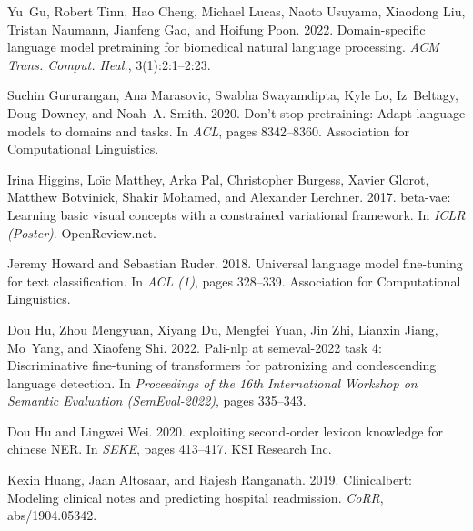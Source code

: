 \documentclass[11pt]{article}
\begin{document}
\begin{thebibliography}{59}
Yu~Gu, Robert Tinn, Hao Cheng, Michael Lucas, Naoto Usuyama, Xiaodong Liu,
  Tristan Naumann, Jianfeng Gao, and Hoifung Poon. 2022.
\newblock Domain-specific language model pretraining for biomedical natural
  language processing.
\newblock \emph{{ACM} Trans. Comput. Heal.}, 3(1):2:1--2:23.

Suchin Gururangan, Ana Marasovic, Swabha Swayamdipta, Kyle Lo, Iz~Beltagy, Doug
  Downey, and Noah~A. Smith. 2020.
\newblock Don't stop pretraining: Adapt language models to domains and tasks.
\newblock In \emph{{ACL}}, pages 8342--8360. Association for Computational
  Linguistics.

Irina Higgins, Lo{\"{\i}}c Matthey, Arka Pal, Christopher Burgess, Xavier
  Glorot, Matthew Botvinick, Shakir Mohamed, and Alexander Lerchner. 2017.
\newblock beta-vae: Learning basic visual concepts with a constrained
  variational framework.
\newblock In \emph{{ICLR} (Poster)}. OpenReview.net.

Jeremy Howard and Sebastian Ruder. 2018.
\newblock Universal language model fine-tuning for text classification.
\newblock In \emph{{ACL} {(1)}}, pages 328--339. Association for Computational
  Linguistics.

Dou Hu, Zhou Mengyuan, Xiyang Du, Mengfei Yuan, Jin Zhi, Lianxin Jiang,
  Mo~Yang, and Xiaofeng Shi. 2022.
\newblock Pali-nlp at semeval-2022 task 4: Discriminative fine-tuning of
  transformers for patronizing and condescending language detection.
\newblock In \emph{Proceedings of the 16th International Workshop on Semantic
  Evaluation (SemEval-2022)}, pages 335--343.

Dou Hu and Lingwei Wei. 2020.
 exploiting second-order lexicon knowledge for chinese
  {NER}.
\newblock In \emph{{SEKE}}, pages 413--417. {KSI} Research Inc.

Kexin Huang, Jaan Altosaar, and Rajesh Ranganath. 2019.
\newblock Clinicalbert: Modeling clinical notes and predicting hospital
  readmission.
\newblock \emph{CoRR}, abs/1904.05342.


\end{thebibliography}
\end{document}
